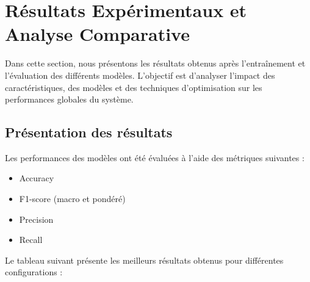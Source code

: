 \documentclass[12pt,a4paper]{article}
\newcommand{\code}[1]{\texttt{#1}}
\begin{document}
    \begin{table}[ht]
    \centering
    \caption{Grilles d’hyperparamètres et paramètres optimaux retenus pour \code{Full(opt)}.}
    \label{tab:hyper}
    \end{table}

    \section{Résultats Expérimentaux et Analyse Comparative}

    Dans cette section, nous présentons les résultats obtenus après l’entraînement et l’évaluation des différents modèles.
    L’objectif est d’analyser l’impact des caractéristiques, des modèles et des techniques d’optimisation sur les performances globales du système.

    \subsection{Présentation des résultats}

    Les performances des modèles ont été évaluées à l’aide des métriques suivantes :
    \begin{itemize}
        \item Accuracy
        \item F1-score (macro et pondéré)
        \item Precision
        \item Recall
    \end{itemize}

    Le tableau suivant présente les meilleurs résultats obtenus pour différentes configurations :
\end{document}

